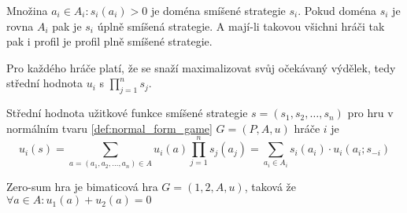 Množina ${a_i \in A_i : s_i(a_i) > 0}$ je doména smíšené strategie $s_i$. Pokud doména $s_i$ je rovna $A_i$ pak je $s_i$ úplně smíšená strategie. A mají-li takovou všichni hráči tak pak i profil je profil plně smíšené strategie. 

Pro každého hráče platí, že se snaží maximalizovat svůj očekávaný výdělek, tedy střední hodnota $u_i$ s $\prod^n_{j=1} s_j$. 
\begin{definition}
\label{def:expected_payoff}
Střední hodnota užitkové funkce smíšené strategie $s = (s_1, s_2, \dots, s_n)$ pro hru v normálním tvaru \ref{def:normal_form_game} $G= (P, A, u)$ hráče $i$ je 
\[
    u_i(s) = \sum_{a = (a_1, a_2, \dots, a_n) \in A} u_i(a) \prod_{j=1}^n s_j(a_j) = \sum_{a_i\in A_i} s_i(a_i) \cdot u_i(a_i; s_{-i})
\]
\end{definition}

\begin{definition}
\label{def:zero_sum}
Zero-sum hra je bimaticová hra $G = ({1,2}, A, u)$, taková že $\forall a \in A: u_1(a) + u_2(a) = 0$
\end{definition}
